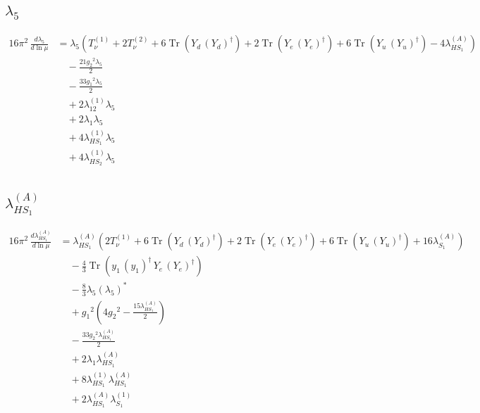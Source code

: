 \documentclass[10pt,a4paper]{article}
\begin{document}
\subsection*{$\lambda_5$}
\begin{align*}
16\pi^2\,\frac{d \lambda_5}{d\ln\mu} &={\lambda_5} (T_{\nu}^{(1)}+2 T_{\nu}^{(2)}+6 \operatorname{Tr}\!\left({Y_d}\,\left({Y_d}\right)^{\dagger}\right)+2 \operatorname{Tr}\!\left({Y_e}\,\left({Y_e}\right)^{\dagger}\right)+6 \operatorname{Tr}\!\left({Y_u}\,\left({Y_u}\right)^{\dagger}\right)-4 {\lambda_{HS_1}^{(A)}}) \\
&\quad -\frac{21 {g_2}^2 {\lambda_5}}{2} \\
&\quad -\frac{33 {g_1}^2 {\lambda_5}}{2} \\
&\quad +2 {\lambda_{12}^{(1)}} {\lambda_5} \\
&\quad +2 {\lambda_1} {\lambda_5} \\
&\quad +4 {\lambda_{HS_1}^{(1)}} {\lambda_5} \\
&\quad +4 {\lambda_{HS_2}^{(1)}} {\lambda_5} \\
\end{align*}
\subsection*{$\lambda_{HS_1}^{(A)}$}
\begin{align*}
16\pi^2\,\frac{d \lambda_{HS_1}^{(A)}}{d\ln\mu} &={\lambda_{HS_1}^{(A)}} (2 T_{\nu}^{(1)}+6 \operatorname{Tr}\!\left({Y_d}\,\left({Y_d}\right)^{\dagger}\right)+2 \operatorname{Tr}\!\left({Y_e}\,\left({Y_e}\right)^{\dagger}\right)+6 \operatorname{Tr}\!\left({Y_u}\,\left({Y_u}\right)^{\dagger}\right)+16 {\lambda_{S_1}^{(A)}}) \\
&\quad -\frac{4}{3} \operatorname{Tr}\!\left({y_1}\,\left({y_1}\right)^{\dagger}\,{Y_e}\,\left({Y_e}\right)^{\dagger}\right) \\
&\quad -\frac{8}{3} {\lambda_5} \left({\lambda_5}\right)^{*} \\
&\quad +{g_1}^2 \left(4 {g_2}^2-\frac{15 {\lambda_{HS_1}^{(A)}}}{2}\right) \\
&\quad -\frac{33 {g_2}^2 {\lambda_{HS_1}^{(A)}}}{2} \\
&\quad +2 {\lambda_1} {\lambda_{HS_1}^{(A)}} \\
&\quad +8 {\lambda_{HS_1}^{(1)}} {\lambda_{HS_1}^{(A)}} \\
&\quad +2 {\lambda_{HS_1}^{(A)}} {\lambda_{S_1}^{(1)}} \\
\end{align*}
\end{document}

